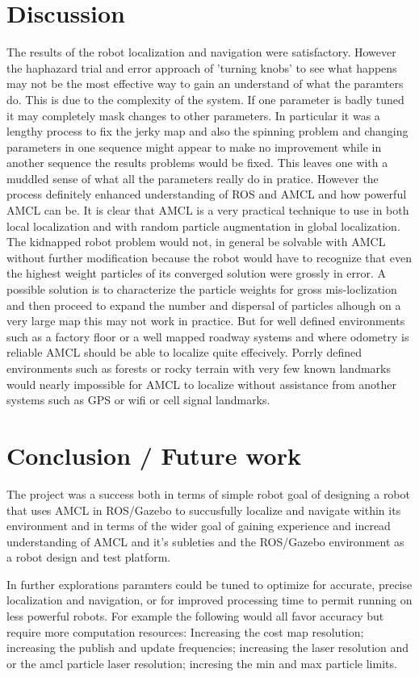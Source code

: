 \documentclass[10pt,journal,compsoc]{IEEEtran}
\begin{document}
\section{Discussion}
The results of the robot localization and navigation were satisfactory. However the haphazard trial and error approach of 'turning knobs' to see what happens may not be the most effective way to gain an understand of what the paramters do. This is due to the complexity of the system. If one parameter is badly tuned it may completely mask changes to other parameters. In particular it was a lengthy process to fix the jerky map and also the spinning problem and changing parameters in one sequence might appear to make no improvement while in another sequence the results problems would be fixed. This leaves one with a muddled sense of what all the parameters really do in pratice. However the process definitely enhanced understanding of ROS and AMCL and how powerful AMCL can be. It is clear that AMCL is a very practical technique to use in both local localization and with random particle augmentation in global localization. The kidnapped robot problem would not, in general be solvable with AMCL without further modification because the robot would have to recognize that even the highest weight particles of its converged solution were grossly in error. A possible solution is to characterize the particle weights for gross mis-loclization and then proceed to expand the number and dispersal of particles alhough on a very large map this may not work in practice. But for well defined environments such as a factory floor or a well mapped roadway systems and where odometry is reliable AMCL should be able to localize quite effecively. Porrly defined environments such as forests or rocky terrain with very few known landmarks would nearly impossible for AMCL to localize without assistance from another systems such as GPS or wifi or cell signal landmarks.

\section{Conclusion / Future work}
The project was a success both in terms of simple robot goal of designing a robot that uses AMCL in ROS/Gazebo to succusfully localize and navigate within its environment and in terms of the wider goal of gaining experience and incread understanding of AMCL and it's subleties and the ROS/Gazebo environment as a robot design and test platform. 

In further explorations paramters could be tuned to optimize for accurate, precise localization and navigation, or for improved processing time to permit running on less powerful robots. For example the following would all favor accuracy but require more computation resources: Increasing the cost map resolution; increasing the publish and update frequencies; increasing the laser resolution and or the amcl particle laser resolution; incresing the min and max particle limits.  
\end{document}
